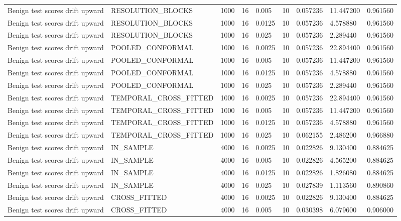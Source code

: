 \begin{tabular}{lllllllll}
Benign test scores drift upward & RESOLUTION\_BLOCKS & 1000 & 16 & 0.005 & 10 & 0.057236 & 11.447200 & 0.961560 \\
Benign test scores drift upward & RESOLUTION\_BLOCKS & 1000 & 16 & 0.0125 & 10 & 0.057236 & 4.578880 & 0.961560 \\
Benign test scores drift upward & RESOLUTION\_BLOCKS & 1000 & 16 & 0.025 & 10 & 0.057236 & 2.289440 & 0.961560 \\
Benign test scores drift upward & POOLED\_CONFORMAL & 1000 & 16 & 0.0025 & 10 & 0.057236 & 22.894400 & 0.961560 \\
Benign test scores drift upward & POOLED\_CONFORMAL & 1000 & 16 & 0.005 & 10 & 0.057236 & 11.447200 & 0.961560 \\
Benign test scores drift upward & POOLED\_CONFORMAL & 1000 & 16 & 0.0125 & 10 & 0.057236 & 4.578880 & 0.961560 \\
Benign test scores drift upward & POOLED\_CONFORMAL & 1000 & 16 & 0.025 & 10 & 0.057236 & 2.289440 & 0.961560 \\
Benign test scores drift upward & TEMPORAL\_CROSS\_FITTED & 1000 & 16 & 0.0025 & 10 & 0.057236 & 22.894400 & 0.961560 \\
Benign test scores drift upward & TEMPORAL\_CROSS\_FITTED & 1000 & 16 & 0.005 & 10 & 0.057236 & 11.447200 & 0.961560 \\
Benign test scores drift upward & TEMPORAL\_CROSS\_FITTED & 1000 & 16 & 0.0125 & 10 & 0.057236 & 4.578880 & 0.961560 \\
Benign test scores drift upward & TEMPORAL\_CROSS\_FITTED & 1000 & 16 & 0.025 & 10 & 0.062155 & 2.486200 & 0.966880 \\
Benign test scores drift upward & IN\_SAMPLE & 4000 & 16 & 0.0025 & 10 & 0.022826 & 9.130400 & 0.884625 \\
Benign test scores drift upward & IN\_SAMPLE & 4000 & 16 & 0.005 & 10 & 0.022826 & 4.565200 & 0.884625 \\
Benign test scores drift upward & IN\_SAMPLE & 4000 & 16 & 0.0125 & 10 & 0.022826 & 1.826080 & 0.884625 \\
Benign test scores drift upward & IN\_SAMPLE & 4000 & 16 & 0.025 & 10 & 0.027839 & 1.113560 & 0.890860 \\
Benign test scores drift upward & CROSS\_FITTED & 4000 & 16 & 0.0025 & 10 & 0.022826 & 9.130400 & 0.884625 \\
Benign test scores drift upward & CROSS\_FITTED & 4000 & 16 & 0.005 & 10 & 0.030398 & 6.079600 & 0.906000 \\

\end{tabular}
